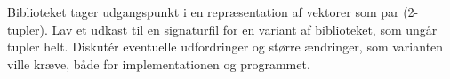 Biblioteket  tager udgangspunkt i en repræsentation af vektorer som par (2-tupler). Lav et udkast til en signaturfil for en variant af biblioteket, som ungår tupler helt. Diskut\'{e}r eventuelle udfordringer og større ændringer, som varianten ville kræve, både for implementationen og programmet.
